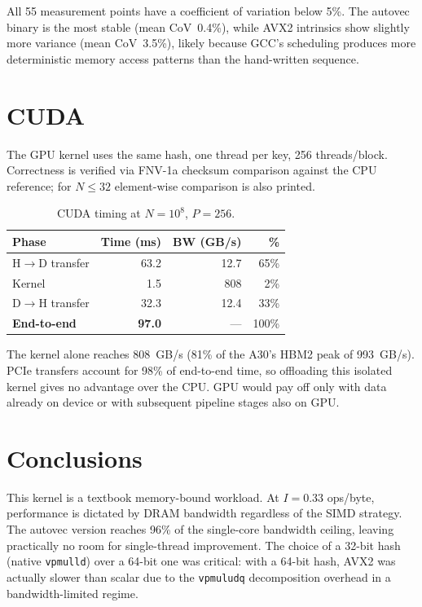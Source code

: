 \documentclass[10pt,a4paper,twocolumn]{article}
\begin{document}
All 55 measurement points have a coefficient of variation below 5\%. The autovec binary is the most stable (mean CoV~0.4\%), while AVX2 intrinsics show slightly more variance (mean CoV~3.5\%), likely because GCC's scheduling produces more deterministic memory access patterns than the hand-written sequence.

\section{CUDA}
\label{sec:cuda}

The GPU kernel uses the same hash, one thread per key, 256 threads/block. Correctness is verified via FNV-1a checksum comparison against the CPU reference; for $N\!\leq\!32$ element-wise comparison is also printed.

\begin{table}[h]
\centering\small
\begin{tabular}{@{}lrrr@{}}
\toprule
\textbf{Phase} & \textbf{Time (ms)} & \textbf{BW (GB/s)} & \textbf{\%} \\
\midrule
H$\to$D transfer & 63.2 & 12.7 & 65\% \\
Kernel           &  1.5 & 808  &  2\% \\
D$\to$H transfer & 32.3 & 12.4 & 33\% \\
\midrule
\textbf{End-to-end} & \textbf{97.0} & --- & 100\% \\
\bottomrule
\end{tabular}
\caption{CUDA timing at $N\!=\!10^8$, $P\!=\!256$.}
\label{tab:cuda}
\end{table}

The kernel alone reaches 808~GB/s (81\% of the A30's HBM2 peak of 993~GB/s). PCIe transfers account for 98\% of end-to-end time, so offloading this isolated kernel gives no advantage over the CPU. GPU would pay off only with data already on device or with subsequent pipeline stages also on GPU.

\section{Conclusions}

This kernel is a textbook memory-bound workload. At $I\!=\!0.33$ ops/byte, performance is dictated by DRAM bandwidth regardless of the SIMD strategy. The autovec version reaches 96\% of the single-core bandwidth ceiling, leaving practically no room for single-thread improvement. The choice of a 32-bit hash (native \texttt{vpmulld}) over a 64-bit one was critical: with a 64-bit hash, AVX2 was actually slower than scalar due to the \texttt{vpmuludq} decomposition overhead in a bandwidth-limited regime.
\end{document}
